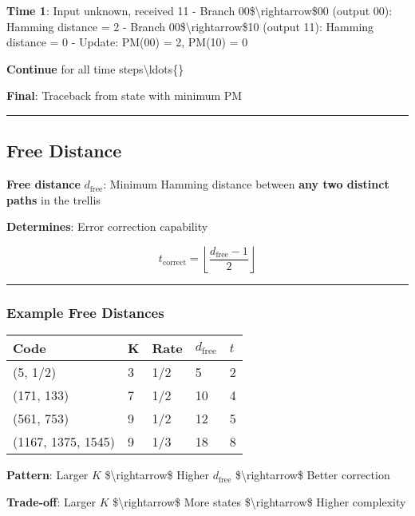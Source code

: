 \textbf{Time 1}: Input unknown, received 11 - Branch
00\$\textbackslash rightarrow\$00 (output 00): Hamming distance = 2 -
Branch 00\$\textbackslash rightarrow\$10 (output 11): Hamming distance =
0 - Update: PM(00) = 2, PM(10) = 0

\textbf{Continue} for all time steps\textbackslash ldots\{\}

\textbf{Final}: Traceback from state with minimum PM

\begin{center}\rule{0.5\linewidth}{0.5pt}\end{center}

\subsection{Free Distance}\label{free-distance}

\textbf{Free distance} \(d_{\text{free}}\): Minimum Hamming distance
between \textbf{any two distinct paths} in the trellis

\textbf{Determines}: Error correction capability

\[
t_{\text{correct}} = \left\lfloor \frac{d_{\text{free}} - 1}{2} \right\rfloor
\]

\begin{center}\rule{0.5\linewidth}{0.5pt}\end{center}

\subsubsection{Example Free Distances}\label{example-free-distances}

{\def\LTcaptype{} %
\begin{longtable}[]{@{}lllll@{}}
\toprule\noalign{}
Code & K & Rate & \(d_{\text{free}}\) & \(t\) \\
\midrule\noalign{}
\endhead
\bottomrule\noalign{}
\endlastfoot
(5, 1/2) & 3 & 1/2 & 5 & 2 \\
(171, 133) & 7 & 1/2 & 10 & 4 \\
(561, 753) & 9 & 1/2 & 12 & 5 \\
(1167, 1375, 1545) & 9 & 1/3 & 18 & 8 \\
\end{longtable}
}

\textbf{Pattern}: Larger \(K\) \$\textbackslash rightarrow\$ Higher
\(d_{\text{free}}\) \$\textbackslash rightarrow\$ Better correction

\textbf{Trade-off}: Larger \(K\) \$\textbackslash rightarrow\$ More
states \$\textbackslash rightarrow\$ Higher complexity

